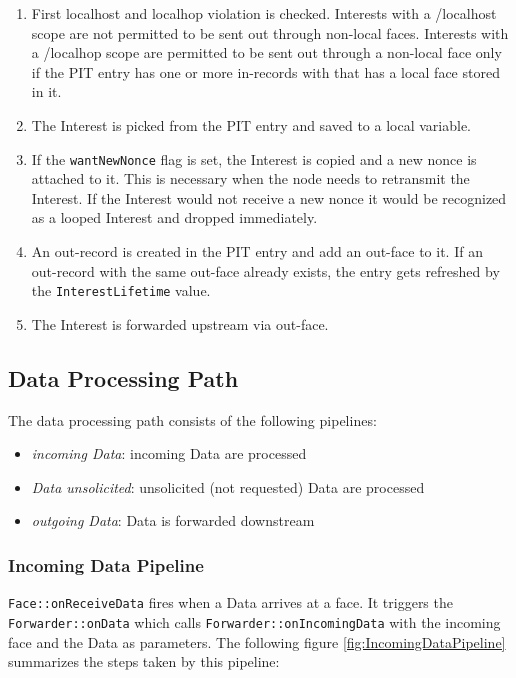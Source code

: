 \begin{enumerate}
\item First localhost and localhop violation is checked. Interests with a /localhost scope are not permitted to be sent out through non-local faces. Interests with a /localhop scope are permitted to be sent out through a non-local face only if the PIT entry has one or more in-records with that has a local face stored in it.
\item The Interest is picked from the PIT entry and saved to a local variable.
\item If the \texttt{wantNewNonce} flag is set, the Interest is copied and a new nonce is attached to it. This is necessary when the node needs to retransmit the Interest. If the Interest would not receive a new nonce it would be recognized as a looped Interest and dropped immediately.
\item An out-record is created in the PIT entry and add an out-face to it. If an out-record with the same out-face already exists, the entry gets refreshed by the \texttt{InterestLifetime} value.
\item The Interest is forwarded upstream via out-face.
\end{enumerate}

\subsection{Data Processing Path}

The data processing path consists of the following pipelines:

\begin{itemize}
\item \emph{incoming Data}: incoming Data are processed
\item \emph{Data unsolicited}: unsolicited (not requested) Data are processed
\item \emph{outgoing Data}: Data is forwarded downstream
\end{itemize}

\subsubsection{Incoming Data Pipeline}

 \texttt{Face::onReceiveData} fires when a Data arrives at a face. It triggers the  \texttt{Forwarder::onData} which calls \texttt{Forwarder::onIncomingData} with the incoming face and the Data as parameters.
The following figure \ref{fig:IncomingDataPipeline} summarizes the steps taken by this pipeline:

